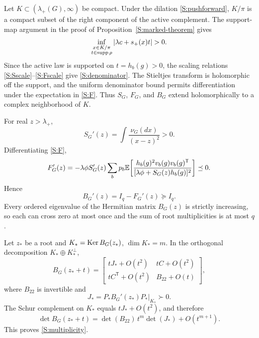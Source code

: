 Let $K\subset(\lambda_+(G),\infty)$ be compact. Under the dilation
\eqref{S:pushforward}, $K/\pi$ is a compact subset of the right component of
the active complement. The support-map argument in the proof of
Proposition~\ref{S:marked-theorem} gives
\begin{equation}
\inf_{\substack{x\in K/\pi\\t\in\supp\rho}}
|\lambda c+s_+(x)t|>0.
\end{equation}
Since the active law is supported on $t=h_b(g)>0$, the scaling relations
\eqref{S:Sscale}--\eqref{S:Fscale} give \eqref{S:denominator}.
The Stieltjes transform is holomorphic off the support, and the uniform
denominator bound permits differentiation under the expectation in
\eqref{S:F}. Thus $S_G$, $F_G$, and $B_G$ extend holomorphically to a
complex neighborhood of $K$.

For real $z>\lambda_+$,
\begin{equation}
S_G'(z)=\int\frac{\nu_G(dx)}{(x-z)^2}>0.
\label{S:Sprime}
\end{equation}
Differentiating \eqref{S:F},
\begin{equation}
F_G'(z)=
-\lambda\phi S_G'(z)\sum_bp_b\mathbb{E}\!\left[
\frac{h_b(g)^2v_b(g)v_b(g)^{\mathsf T}}
{[\lambda\phi+S_G(z)h_b(g)]^2}
\right]\preceq0.
\label{S:Fprime}
\end{equation}
Hence
\begin{equation}
B_G'(z)=I_q-F_G'(z)\succeq I_q.
\label{S:Bprime}
\end{equation}
Every ordered eigenvalue of the Hermitian matrix $B_G(z)$ is strictly increasing, so each can cross zero at most once and the sum of root multiplicities is at most $q$.

Let $z_*$ be a root and $K_*=\operatorname{Ker} B_G(z_*)$, $\dim K_*=m$. In the orthogonal decomposition $K_*\oplus K_*^\perp$,
\begin{equation}
B_G(z_*+t)=
\begin{bmatrix}
tJ_*+O(t^2)&tC+O(t^2)\\
tC^{\mathsf T}+O(t^2)&B_{22}+O(t)
\end{bmatrix},
\end{equation}
where $B_{22}$ is invertible and
\begin{equation}
J_*=\left.P_*B_G'(z_*)P_*\right|_{K_*}\succ0.
\end{equation}
The Schur complement on $K_*$ equals $tJ_*+O(t^2)$, and therefore
\begin{equation}
\det B_G(z_*+t)
=
\det(B_{22})\,t^m\det(J_*)+O(t^{m+1}).
\end{equation}
This proves \eqref{S:multiplicity}.


